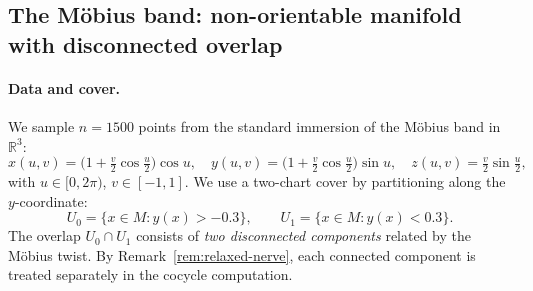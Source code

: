 \documentclass[11pt]{article}
\newcommand{\R}{\mathbb{R}}
\theoremstyle{plain}
\theoremstyle{definition}
\theoremstyle{remark}
\begin{document}
\subsection{The M\"obius band: non-orientable manifold with disconnected overlap}\label{sec:exp-mobius}

\paragraph{Data and cover.}
We sample $n = 1500$ points from the standard immersion of the M\"obius band in $\R^3$:
\[
x(u, v) = \bigl(1 + \tfrac{v}{2}\cos\tfrac{u}{2}\bigr)\cos u,\quad
y(u, v) = \bigl(1 + \tfrac{v}{2}\cos\tfrac{u}{2}\bigr)\sin u,\quad
z(u, v) = \tfrac{v}{2}\sin\tfrac{u}{2},
\]
with $u \in [0, 2\pi)$, $v \in [-1, 1]$. We use a two-chart cover by partitioning along the $y$-coordinate:
\[
U_0 = \{x \in M : y(x) > -0.3\},\qquad U_1 = \{x \in M : y(x) < 0.3\}.
\]
The overlap $U_0 \cap U_1$ consists of \emph{two disconnected components} related by the M\"obius twist. By Remark~\ref{rem:relaxed-nerve}, each connected component is treated separately in the cocycle computation.
\end{document}
